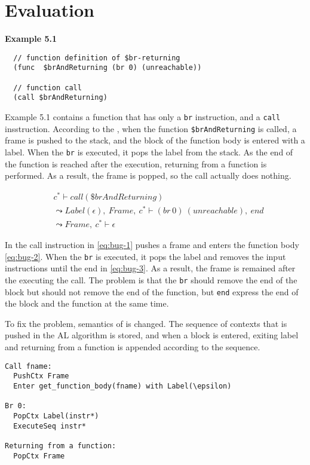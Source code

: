 
\chapter{Evaluation}
\label{ch:eval}
\noindent


\textbf{Example 5.1}
\begin{verbatim}
  // function definition of $br-returning
  (func  $brAndReturning (br 0) (unreachable))

  // function call
  (call $brAndReturning)
\end{verbatim}

Example 5.1 contains a function that has only a \texttt{br} instruction, and a
\texttt{call} insstruction.
According to the \officialp{}, when the function \texttt{\$brAndReturning} is
called, a frame is pushed to the stack, and the block of the function
body is entered with a label.
When the \texttt{br} is executed, it pops the label from the stack.
As the end of the function is reached after the execution, returning from a
function is performed.
As a result, the frame is popped, so the call actually does nothing.


\begin{align}
  &c^* \vdash call(\$brAndReturning) \label{eq:bug-1} \\
&\leadsto
  Label(\epsilon), ~ Frame, ~ c^* \vdash (br ~ 0) ~ (unreachable), ~ end \label{eq:bug-2} \\
&\leadsto
  Frame, ~ c^* \vdash \epsilon \label{eq:bug-3}
\end{align}

In \spectecp{} the call instruction in \cref{eq:bug-1} pushes a frame and
enters the function body \cref{eq:bug-2}.
When the \texttt{br} is executed, it pops the label and removes the input
instructions until the end in \cref{eq:bug-3}.
As a result, the frame is remained after the executing the call.
The problem is that the \texttt{br} should remove the end of the block but
should not remove the end of the function, but \texttt{end} express the end of
the block and the function at the same time.


To fix the problem, semantics of \enteri is changed.
The sequence of contexts that is pushed in the AL algorithm is stored,
and when a block is entered, exiting label and returning from a function is
appended according to the sequence.


\begin{verbatim}
Call fname:
  PushCtx Frame
  Enter get_function_body(fname) with Label(\epsilon)

Br 0:
  PopCtx Label(instr*)
  ExecuteSeq instr*

Returning from a function:
  PopCtx Frame
\end{verbatim}

